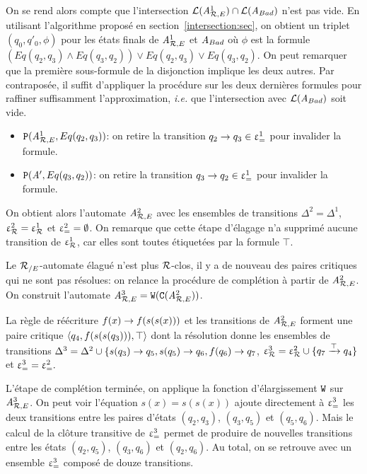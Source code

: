 On se rend alors compte que l'intersection $\mathcal{L}({\mathit A}_{\mathcal R,E}^1) \cap \mathcal{L}(\mathit A_{Bad})$
n'est pas vide. En utilisant l'algorithme proposé en section~\ref{intersection:sec},
on obtient un triplet $(q_0,q'_0,\phi)$ pour les états finals
de ${\mathit A}_{\mathcal R,E}^1$ et $\mathit A_{Bad}$ où $\phi$ est la formule 
$(Eq(q_2,q_3) \land Eq(q_3,q_2)) \lor Eq(q_2,q_3) \lor Eq(q_3,q_2)$.
On peut remarquer que la première sous-formule de la disjonction implique les deux autres.
Par contraposée, il suffit d'appliquer la procédure sur les deux dernières formules
pour raffiner suffisamment l'approximation, \textit{i.e.} que l'intersection
avec $\mathcal{L}(\mathit A_{Bad})$ soit vide.
\begin{itemize}
  \item $\mathtt{P}({\mathit A}_{\mathcal R,E}^1, Eq(q_2,q_3))$: on retire la transition 
    $q_2 \rightarrow q_3 \in \upvarepsilon_{=}^1$ pour invalider la formule.
  \item $\mathtt{P}(\mathit A', Eq(q_3,q_2))$: on retire la transition 
        $q_3 \rightarrow q_2 \in \upvarepsilon_{=}^1$ pour invalider la formule.
\end{itemize}
On obtient alors l'automate ${\mathit A}_{\mathcal R,E}^2$ avec les ensembles de transitions
$\Delta^2=\Delta^1$, $\upvarepsilon_{\mathcal R}^2= \upvarepsilon_{\mathcal R}^1$ et $\upvarepsilon_{=}^2=\emptyset$.
On remarque que cette étape d'élagage n'a supprimé aucune
transition de $\upvarepsilon_{\mathcal R}^1$, car elles sont toutes étiquetées
par la formule $\top$.

Le ${\mathcal R_{/E}}$-automate élagué n'est plus $\mathcal R$-clos, il y a de nouveau
des paires critiques qui ne sont pas résolues: on relance la procédure
de complétion à partir de ${\mathit A}_{\mathcal R,E}^2$.
On construit l'automate ${\mathit A}_{\mathcal R,E}^3=\mathtt{W}(\mathtt{C}({\mathit A}_{\mathcal R,E}^2))$.

La règle de réécriture $f(x) \rightarrow f(s(s(x)))$ et les transitions de ${\mathit A}_{\mathcal R,E}^2$ 
forment une paire critique $\langle q_4, f(s(s(q_3))), \top \rangle$ dont la résolution donne
les ensembles de transitions  $\Delta^3 = \Delta^2 \cup
\{s(q_3)\rightarrow q_5, s(q_5)\rightarrow q_6, f(q_6) \rightarrow q_7$, $\upvarepsilon_{\mathcal R}^3 = \upvarepsilon_{\mathcal R}^2 \cup
\{q_7\xrightarrow{\top}q_4\}$ et $\upvarepsilon_{=}^3 = \upvarepsilon_{=}^2.$

L'étape de complétion terminée, on applique la fonction d'élargissement
$\mathtt{W}$ sur ${\mathit A}_{\mathcal R,E}^3$. 
On peut voir l'équation $s(x) = s(s(x))$ ajoute  directement à $\upvarepsilon_{=}^3$
les deux transitions entre les paires d'états $(q_2,q_3)$, $(q_3,q_5)$ et
$(q_5,q_6)$. Mais le calcul de la clôture transitive de $\upvarepsilon_{=}^3$ permet de produire
de nouvelles transitions entre les états $(q_2,q_5)$, $(q_3,q_6)$ et $(q_2,q_6)$.
Au total, on se retrouve avec un ensemble $\upvarepsilon_{=}^3$ composé de douze transitions.



